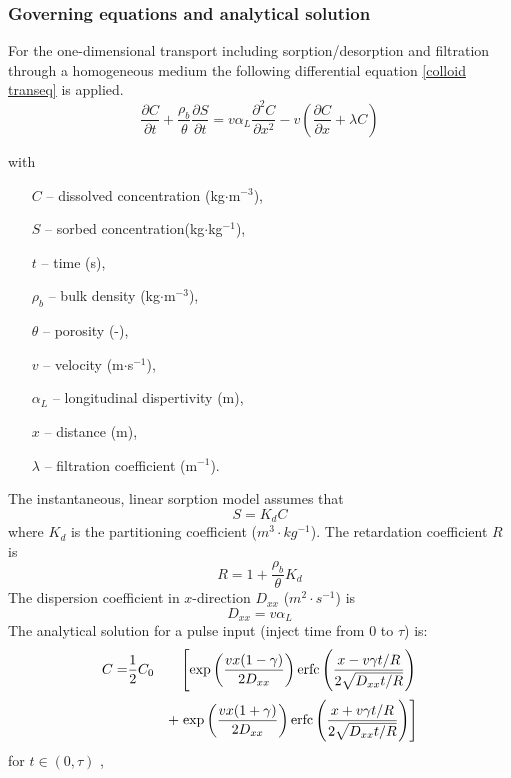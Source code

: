 \subsubsection*{Governing equations and analytical solution}
%
For the one-dimensional transport including sorption/desorption and filtration through a homogeneous medium the following differential equation \ref{colloid transeq} is applied.
\begin{equation}\label{colloid transeq}
\frac{\partial C}{\partial t} + \frac{\rho_b}{\theta} \frac{\partial S}{\partial t} = v \alpha_L \frac{\partial^2 C}{\partial x^2} - v (\frac{\partial C}{\partial x} + \lambda C)
\end{equation}
{\small
with
\begin{itemize}
\item[$C$] -- dissolved concentration (kg$\cdot$m$^{-3}$),
\item[$S$] -- sorbed concentration(kg$\cdot$kg$^{-1}$),
\item[$t$] -- time (s),
\item[$\rho_b$] -- bulk density (kg$\cdot$m$^{-3}$),
\item[$\theta$] -- porosity (-),
\item[$v$] -- velocity (m$\cdot$s$^{-1}$),
\item[$\alpha_L$] -- longitudinal dispertivity (m),
\item[$x$] -- distance (m),
\item[$\lambda$] -- filtration coefficient (m$^{-1}$).
\end{itemize}
}

The instantaneous, linear sorption model assumes that
\begin{equation}\label{colloid sorption model}
S = K_{d} C
\end{equation}
where $K_{d}$ is the partitioning coefficient ($m^3 \cdot kg^{-1}$). The retardation coefficient $R$ is
\begin{equation}\label{colloid retardation coefficient}
R = 1 + \frac{\rho_b}{\theta} K_{d}
\end{equation}
The dispersion coefficient in $x$-direction $D_{xx}$ ($m^2 \cdot s^{-1}$) is
\begin{equation}\label{colloid dispersion x}
D_{xx} = v \alpha_L
\end{equation}
The analytical solution for a pulse input (inject time from 0 to $\tau$) is:
\begin{eqnarray}\label{colloid analytical 1}
C = & \frac{1}{2} C_0 &
\mbox{\hspace{-1.5ex}}\mbox{\hspace{-1.5ex}}
\left[
\exp
\left(
\frac{v x(1-\gamma)}{2 D_{xx}}
\right)
\mathrm{erfc}
\left(
\frac{x-v\gamma t/R}{2 \sqrt{D_{xx} t/R}}
\right)
\right. \nonumber\\[0.5ex]
& &
+\left.
\exp
\left(
\frac{v x(1+\gamma)}{2 D_{xx}}
\right)
\mathrm{erfc}
\left(
\frac{x+v\gamma t/R}{2 \sqrt{D_{xx} t/R}}
\right)
\right]
\end{eqnarray}
for $t \in (0, \tau) $ ,

